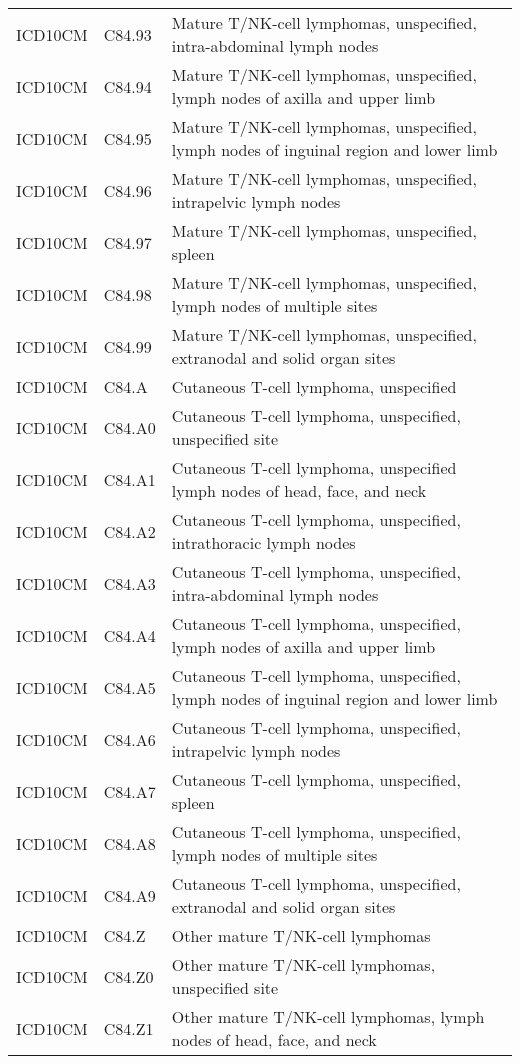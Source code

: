 \begin{longtable}{p{}p{}p{}}
  ICD10CM & C84.93 & Mature T/NK-cell lymphomas, unspecified, intra-abdominal lymph nodes \\ 
  ICD10CM & C84.94 & Mature T/NK-cell lymphomas, unspecified, lymph nodes of axilla and upper limb \\ 
  ICD10CM & C84.95 & Mature T/NK-cell lymphomas, unspecified, lymph nodes of inguinal region and lower limb \\ 
  ICD10CM & C84.96 & Mature T/NK-cell lymphomas, unspecified, intrapelvic lymph nodes \\ 
  ICD10CM & C84.97 & Mature T/NK-cell lymphomas, unspecified, spleen \\ 
  ICD10CM & C84.98 & Mature T/NK-cell lymphomas, unspecified, lymph nodes of multiple sites \\ 
  ICD10CM & C84.99 & Mature T/NK-cell lymphomas, unspecified, extranodal and solid organ sites \\ 
  ICD10CM & C84.A & Cutaneous T-cell lymphoma, unspecified \\ 
  ICD10CM & C84.A0 & Cutaneous T-cell lymphoma, unspecified, unspecified site \\ 
  ICD10CM & C84.A1 & Cutaneous T-cell lymphoma, unspecified lymph nodes of head, face, and neck \\ 
  ICD10CM & C84.A2 & Cutaneous T-cell lymphoma, unspecified, intrathoracic lymph nodes \\ 
  ICD10CM & C84.A3 & Cutaneous T-cell lymphoma, unspecified, intra-abdominal lymph nodes \\ 
  ICD10CM & C84.A4 & Cutaneous T-cell lymphoma, unspecified, lymph nodes of axilla and upper limb \\ 
  ICD10CM & C84.A5 & Cutaneous T-cell lymphoma, unspecified, lymph nodes of inguinal region and lower limb \\ 
  ICD10CM & C84.A6 & Cutaneous T-cell lymphoma, unspecified, intrapelvic lymph nodes \\ 
  ICD10CM & C84.A7 & Cutaneous T-cell lymphoma, unspecified, spleen \\ 
  ICD10CM & C84.A8 & Cutaneous T-cell lymphoma, unspecified, lymph nodes of multiple sites \\ 
  ICD10CM & C84.A9 & Cutaneous T-cell lymphoma, unspecified, extranodal and solid organ sites \\ 
  ICD10CM & C84.Z & Other mature T/NK-cell lymphomas \\ 
  ICD10CM & C84.Z0 & Other mature T/NK-cell lymphomas, unspecified site \\ 
  ICD10CM & C84.Z1 & Other mature T/NK-cell lymphomas, lymph nodes of head, face, and neck \\ 

\end{longtable}
